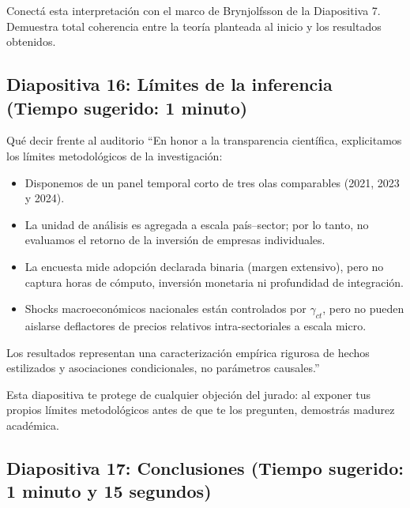 \documentclass[11pt,a4paper]{article}
\begin{document}
\begin{tipbox}
Conectá esta interpretación con el marco de Brynjolfsson de la Diapositiva 7. Demuestra total coherencia entre la teoría planteada al inicio y los resultados obtenidos.
\end{tipbox}

\subsection*{Diapositiva 16: Límites de la inferencia (Tiempo sugerido: 1 minuto)}

\begin{speechbox}{Qué decir frente al auditorio}
``En honor a la transparencia científica, explicitamos los límites metodológicos de la investigación:
\begin{itemize}[itemsep=0.15em]
  \item Disponemos de un panel temporal corto de tres olas comparables (2021, 2023 y 2024).
  \item La unidad de análisis es agregada a escala país--sector; por lo tanto, no evaluamos el retorno de la inversión de empresas individuales.
  \item La encuesta mide adopción declarada binaria (margen extensivo), pero no captura horas de cómputo, inversión monetaria ni profundidad de integración.
  \item Shocks macroeconómicos nacionales están controlados por $\gamma_{ct}$, pero no pueden aislarse deflactores de precios relativos intra-sectoriales a escala micro.
\end{itemize}
Los resultados representan una caracterización empírica rigurosa de hechos estilizados y asociaciones condicionales, no parámetros causales.''
\end{speechbox}

\begin{tipbox}
Esta diapositiva te protege de cualquier objeción del jurado: al exponer tus propios límites metodológicos antes de que te los pregunten, demostrás madurez académica.
\end{tipbox}

\subsection*{Diapositiva 17: Conclusiones (Tiempo sugerido: 1 minuto y 15 segundos)}
\end{document}
